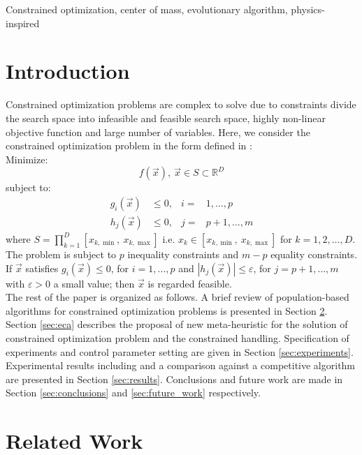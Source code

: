 \documentclass[conference]{IEEEtran}
\begin{document}
\begin{IEEEkeywords}
Constrained optimization, center of mass, evolutionary algorithm, physics-inspired
\end{IEEEkeywords}

\section{Introduction}
Constrained optimization problems are complex to solve due to constraints divide the search space into infeasible and feasible search space, highly non-linear objective function and large number of variables. Here, we consider the constrained optimization problem in the form defined in \cite{cecCop17}:\\

\noindent
Minimize:
\begin{equation}
	f(\vec{x}),\ \vec{x}  \in S \subset \mathbb{R}^D
	\label{eqn:fx}
\end{equation}
%
subject to:
\begin{align*}
	g_i(\vec{x}) &\leq 0,& i =&  1 , \ldots, p \\
	h_j(\vec{x}) &\leq 0,& j =& p+1, \ldots, m
\end{align*}
%
where $S = \prod_{k = 1}^D  [ x_{k,\min},\ x_{k,\max} ]$ i.e. $x_k \in [ x_{k,\min},\ x_{k,\max} ]$ for $k = 1,2,\ldots,D$. The problem is subject to $p$ inequality constraints and $m - p$ equality constraints. If $\vec{x}$ satisfies $g_i( \vec{x} ) \leq 0$, for $i = 1, \ldots, p$ and $|h_j(\vec{x})| \leq \varepsilon$, for $j = p+1, \ldots, m$ with $\varepsilon > 0$ a small value; then $\vec{x}$ is regarded feasible.\\


The rest of the paper is organized as follows. A brief review of population-based algorithms for constrained optimization problems is presented in Section \ref{sec:related_work}. Section \ref{sec:eca} describes the proposal of new meta-heuristic for the solution of constrained optimization problem and the constrained handling. Specification of experiments and control parameter setting are given in Section \ref{sec:experiments}. Experimental results including and a comparison against a competitive algorithm are presented in Section \ref{sec:results}. Conclusions and future work are made in Section \ref{sec:conclusions} and \ref{sec:future_work} respectively.


\section{Related Work} %
\label{sec:related_work}
\end{document}
